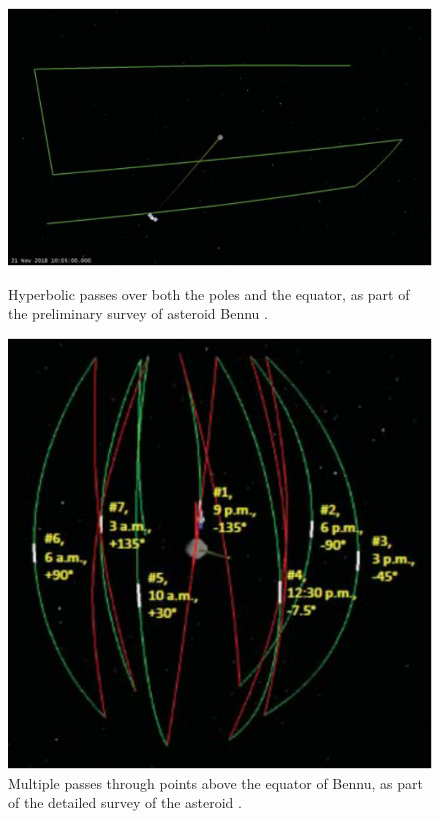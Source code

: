 \begin{figure}[h]
\begin{minipage}[t]{0.45\linewidth}
\centering
\includegraphics[width=\textwidth]{osirishyper.png}
\caption{Hyperbolic passes over both the poles and the equator, as part of the preliminary survey of asteroid Bennu \cite{osiris}.}
\label{fig:osirishyper}
\end{minipage}
\hspace{0.5cm}
\begin{minipage}[t]{0.45\linewidth}
\centering
\includegraphics[width=\textwidth]{osirisorbits.png}
\caption{Multiple passes through points above the equator of Bennu, as part of the detailed survey of the asteroid \cite{osiris}.}
\label{fig:osirisorbits}
\end{minipage}
\end{figure}
\FloatBarrier

